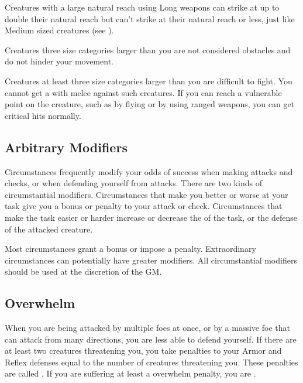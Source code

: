             Creatures with a large natural reach using Long weapons can strike at up to double their natural reach but can't strike at their natural reach or less, just like Medium sized creatures (see ).

             Creatures three size categories larger than you are not considered obstacles and do not hinder your movement.

             Creatures at least three size categories larger than you are difficult to fight. You cannot get a  with melee  against such creatures. If you can reach a vulnerable point on the creature, such as by flying or by using ranged weapons, you can get critical hits normally.

    \subsection{Arbitrary Modifiers}

        Circumstances frequently modify your odds of success when making attacks and checks, or when defending yourself from attacks.
        There are two kinds of circumstantial modifiers.
        Circumstances that make you better or worse at your task give you a bonus or penalty to your attack or check.
        Circumstances that make the task easier or harder increase or decrease the  of the task, or the defense of the attacked creature.

        Most circumstances grant a  bonus or impose a  penalty.
        Extraordinary circumstances can potentially have greater modifiers.
        All circumstantial modifiers should be used at the discretion of the GM.\@

    \subsection{Overwhelm}\label{Overwhelm}
        When you are being attacked by multiple foes at once, or by a massive foe that can attack from many directions, you are less able to defend yourself.
        If there are at least two creatures threatening you, you take penalties to your Armor and Reflex defenses equal to the number of creatures threatening you.
        These penalties are called .
        If you are suffering at least a  overwhelm penalty, you are .

